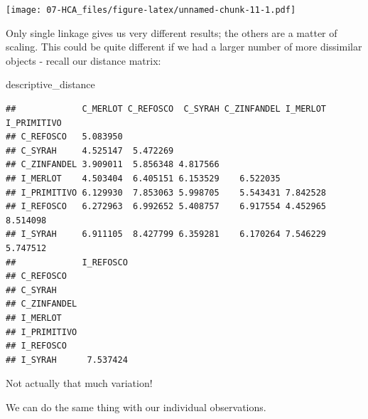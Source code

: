 \documentclass[
]{book}
\newenvironment{Shaded}{\begin{snugshade}}{\end{snugshade}}
\newcommand{\NormalTok}[1]{#1}
\begin{document}
\texttt{[image: 07-HCA\_files/figure-latex/unnamed-chunk-11-1.pdf]}

Only single linkage gives us very different results; the others are a matter of scaling. This could be quite different if we had a larger number of more dissimilar objects - recall our distance matrix:

\begin{Shaded}
\begin{Highlighting}[]
\NormalTok{descriptive\_distance}
\end{Highlighting}
\end{Shaded}

\begin{verbatim}
##             C_MERLOT C_REFOSCO  C_SYRAH C_ZINFANDEL I_MERLOT I_PRIMITIVO
## C_REFOSCO   5.083950                                                    
## C_SYRAH     4.525147  5.472269                                          
## C_ZINFANDEL 3.909011  5.856348 4.817566                                 
## I_MERLOT    4.503404  6.405151 6.153529    6.522035                     
## I_PRIMITIVO 6.129930  7.853063 5.998705    5.543431 7.842528            
## I_REFOSCO   6.272963  6.992652 5.408757    6.917554 4.452965    8.514098
## I_SYRAH     6.911105  8.427799 6.359281    6.170264 7.546229    5.747512
##             I_REFOSCO
## C_REFOSCO            
## C_SYRAH              
## C_ZINFANDEL          
## I_MERLOT             
## I_PRIMITIVO          
## I_REFOSCO            
## I_SYRAH      7.537424
\end{verbatim}

Not actually that much variation!

We can do the same thing with our individual observations.
\end{document}
